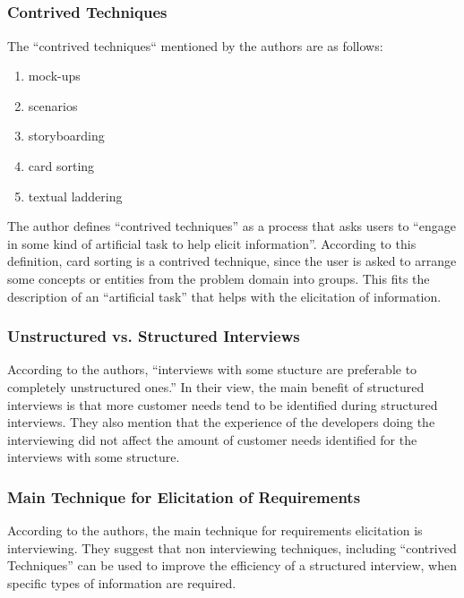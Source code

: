 \documentclass[letterpaper,12pt]{article}
\begin{document}
\subsection{}

\subsubsection{Contrived Techniques}
The ``contrived techniques`` mentioned by the authors are as follows:
\begin{enumerate}
 \item mock-ups
 \item scenarios
 \item storyboarding
 \item card sorting
 \item textual laddering
\end{enumerate}
The author defines ``contrived techniques'' as a process that asks users to
``engage in some kind of artificial task to help elicit information''. According
to this definition, card sorting is a contrived technique, since the user is
asked to arrange some concepts or entities from the problem domain into groups.
This fits the description of an ``artificial task'' that helps with the
elicitation of information.

\subsubsection{Unstructured vs. Structured Interviews}

According to the authors, ``interviews with some stucture are preferable to
completely unstructured ones.'' In their view, the main benefit of  structured
interviews is that more customer needs tend to be identified during structured
interviews. They also mention that the experience of the developers doing the
interviewing did not affect the amount of customer needs identified for the
interviews with some structure.


\subsubsection{Main Technique for Elicitation of Requirements}

According to the authors, the main technique for requirements elicitation is
interviewing. They suggest that non interviewing techniques, including
``contrived Techniques'' can be used to improve the efficiency of
a structured interview, when specific types of information are
required.
\end{document}
